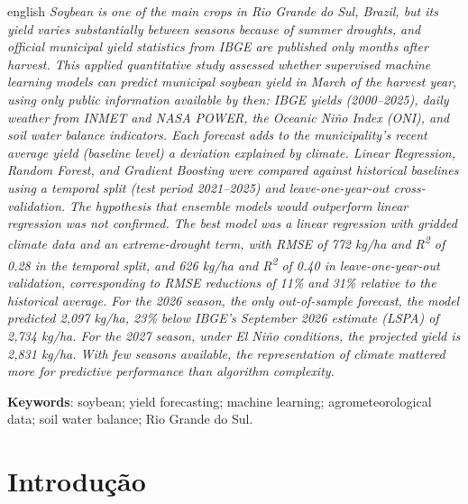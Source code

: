 \documentclass[
	article,			%
	11pt,				%
	oneside,			%
	a4paper,			%
	english,			%
	brazil,				%
	sumario=tradicional
	]{abntex2}
\begin{document}
\renewcommand{\resumoname}{Abstract}
\begin{resumoumacoluna}
 \begin{otherlanguage*}{english}
\textit{Soybean is one of the main crops in Rio Grande do Sul, Brazil, but its yield varies substantially between seasons because of summer droughts, and official municipal yield statistics from IBGE are published only months after harvest. This applied quantitative study assessed whether supervised machine learning models can predict municipal soybean yield in March of the harvest year, using only public information available by then: IBGE yields (2000--2025), daily weather from INMET and NASA POWER, the Oceanic Niño Index (ONI), and soil water balance indicators. Each forecast adds to the municipality's recent average yield (baseline level) a deviation explained by climate. Linear Regression, Random Forest, and Gradient Boosting were compared against historical baselines using a temporal split (test period 2021--2025) and leave-one-year-out cross-validation. The hypothesis that ensemble models would outperform linear regression was not confirmed. The best model was a linear regression with gridded climate data and an extreme-drought term, with RMSE of 772 kg/ha and R\textsuperscript{2} of 0.28 in the temporal split, and 626 kg/ha and R\textsuperscript{2} of 0.40 in leave-one-year-out validation, corresponding to RMSE reductions of 11\% and 31\% relative to the historical average. For the 2026 season, the only out-of-sample forecast, the model predicted 2,097 kg/ha, 23\% below IBGE's September 2026 estimate (LSPA) of 2,734 kg/ha. For the 2027 season, under El Niño conditions, the projected yield is 2,831 kg/ha. With few seasons available, the representation of climate mattered more for predictive performance than algorithm complexity.}

   \vspace{\onelineskip}

   \noindent
   \textbf{Keywords}: soybean; yield forecasting; machine learning; agrometeorological data; soil water balance; Rio Grande do Sul.
 \end{otherlanguage*}
\end{resumoumacoluna}

\textual

\section{Introdução}\label{sec:intro}
\end{document}
